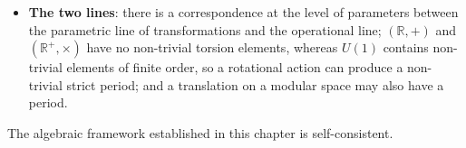 \begin{remark}
\begin{itemize}
    \[
    f(x+a)=f(x),\qquad f(qx)=f(x),\qquad f(e^{i\theta}z)=f(z)
    \]
    which provide a function-level motivation for the extension of number systems in the next chapter.
    \item \textbf{The two lines}: there is a correspondence at the level of parameters between the parametric line of transformations and the operational line; $(\mathbb{R},+)$ and $(\mathbb{R}^+,\times)$ have no non-trivial torsion elements, whereas $U(1)$ contains non-trivial elements of finite order, so a rotational action can produce a non-trivial strict period; and a translation on a modular space may also have a period.
\end{itemize}
The algebraic framework established in this chapter is self-consistent.
\end{remark}